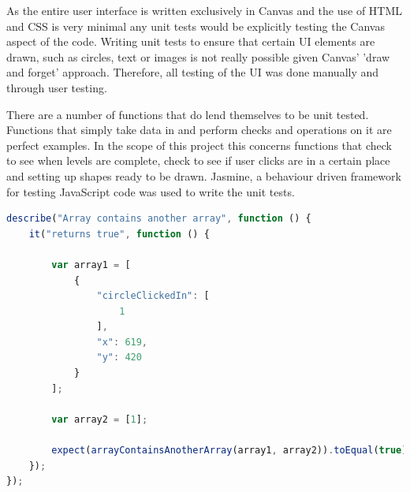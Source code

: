 \documentclass[12pt,a4paper]{report}
\begin{document}
As the entire user interface is written exclusively in Canvas and the use of HTML and CSS is very minimal any unit tests would be explicitly testing the Canvas aspect of the code. Writing unit tests to ensure that certain UI elements are drawn, such as circles, text or images is not really possible given Canvas' 'draw and forget' approach. Therefore, all testing of the UI was done manually and through user testing.

There are a number of functions that do lend themselves to be unit tested. Functions that simply take data in and perform checks and operations on it are perfect examples. In the scope of this project this concerns functions that check to see when levels are complete, check to see if user clicks are in a certain place and setting up shapes ready to be drawn. Jasmine, a behaviour driven framework for testing JavaScript code was used to write the unit tests.

\begin{lstlisting}[language=JavaScript]
describe("Array contains another array", function () {
    it("returns true", function () {

        var array1 = [
            {
                "circleClickedIn": [
                    1
                ],
                "x": 619,
                "y": 420
            }
        ];

        var array2 = [1];

        expect(arrayContainsAnotherArray(array1, array2)).toEqual(true);
    });
});
\end{lstlisting}

 
\end{document}

